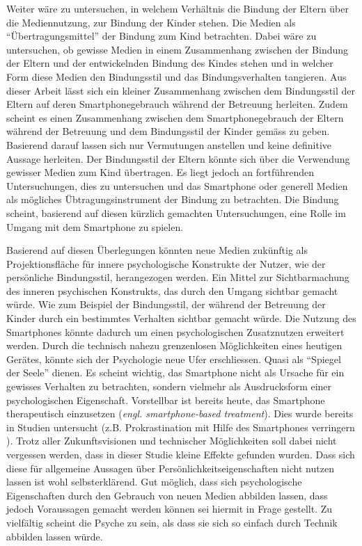 Weiter wäre zu untersuchen, in welchem Verhältnis die Bindung der Eltern über die Mediennutzung, zur Bindung der Kinder stehen. Die Medien als \enquote{Übertragungsmittel} der Bindung zum Kind betrachten. Dabei wäre zu untersuchen, ob gewisse Medien in einem Zusammenhang zwischen der Bindung der Eltern und der entwickelnden Bindung des Kindes stehen und in welcher Form diese Medien den Bindungsstil und das Bindungsverhalten tangieren. Aus dieser Arbeit lässt sich ein kleiner Zusammenhang zwischen dem Bindungsstil der Eltern auf deren Smartphonegebrauch während der Betreuung herleiten. Zudem scheint es einen Zusammenhang zwischen dem Smartphonegebrauch der Eltern während der Betreuung und dem Bindungsstil der Kinder gemäss  zu geben. Basierend darauf lassen sich nur Vermutungen anstellen und keine definitive Aussage herleiten. Der Bindungsstil der Eltern könnte sich über die Verwendung gewisser Medien zum Kind übertragen. Es liegt jedoch an fortführenden Untersuchungen, dies zu untersuchen und das Smartphone oder generell Medien als mögliches Übtragungsinstrument der Bindung zu betrachten. Die Bindung scheint, basierend auf diesen kürzlich gemachten Untersuchungen, eine Rolle im Umgang mit dem Smartphone zu spielen.

Basierend auf diesen Überlegungen könnten neue Medien zukünftig als Projektionsfläche für innere psychologische Konstrukte der Nutzer, wie der persönliche Bindungsstil, herangezogen werden. Ein Mittel zur Sichtbarmachung des inneren psychischen Konstrukts, das durch den Umgang sichtbar gemacht würde. Wie zum Beispiel der Bindungsstil, der während der Betreuung der Kinder durch ein bestimmtes Verhalten sichtbar gemacht würde. Die Nutzung des Smartphones könnte dadurch um einen psychologischen Zusatznutzen erweitert werden. Durch die technisch nahezu grenzenlosen Möglichkeiten eines heutigen Gerätes, könnte sich der Psychologie neue Ufer erschliessen. Quasi als \enquote{Spiegel der Seele} dienen. Es scheint wichtig, das Smartphone nicht als Ursache für ein gewisses Verhalten zu betrachten, sondern vielmehr als Ausdrucksform einer psychologischen Eigenschaft. Vorstellbar ist bereits heute, das Smartphone therapeutisch einzusetzen (\textit{engl. smartphone-based treatment}). Dies wurde bereits in Studien untersucht (z.B. Prokrastination mit Hilfe des Smartphones verringern \cite{Lukas2018}). Trotz aller Zukunftsvisionen und technischer Möglichkeiten soll dabei nicht vergessen werden, dass in dieser Studie kleine Effekte gefunden wurden. Dass sich diese für allgemeine Aussagen über Persönlichkeitseigenschaften nicht nutzen lassen ist wohl selbsterklärend. Gut möglich, dass sich psychologische Eigenschaften durch den Gebrauch von neuen Medien abbilden lassen, dass jedoch Voraussagen gemacht werden können sei hiermit in Frage gestellt. Zu vielfältig scheint die Psyche zu sein, als dass sie sich so einfach durch Technik abbilden lassen würde.  

